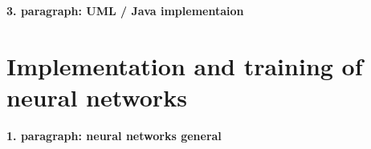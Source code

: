 \documentclass[12pt]{scrartcl}
\begin{document}
\textbf{3. paragraph: UML / Java implementaion}

%
%
%
%
%

\newpage


\section*{Implementation and training of neural networks}

\textbf{1. paragraph: neural networks general}

\end{document}
